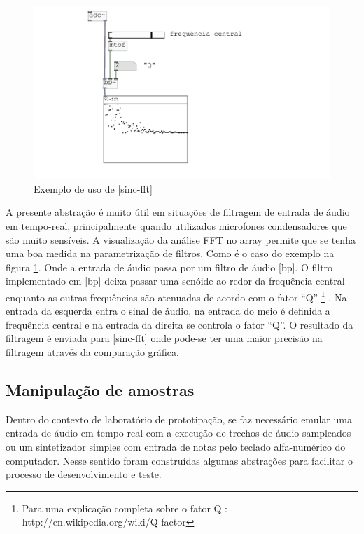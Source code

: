 \documentclass{ppgmus}
\begin{document}
\begin{figure}
\includegraphics[scale=.55]{sinc-fft-help}
\caption{Exemplo de uso de [sinc-fft]}
\label{sinc-fft-help}
\end{figure}


A presente abstração é muito útil em situações de filtragem de entrada de áudio em tempo-real, principalmente
quando utilizados microfones condensadores que são muito sensíveis.
A visualização da análise FFT no array permite que se tenha uma boa medida na parametrização de filtros.
Como é o caso do exemplo na figura \ref{sinc-fft-help}. Onde a entrada de áudio passa por um filtro
de áudio [bp\texttildelow]. O filtro implementado em [bp\texttildelow] deixa passar uma senóide ao
redor da frequência central enquanto as outras frequências são atenuadas de acordo com o fator ``Q''
\footnote{Para uma explicação completa sobre o fator Q : http://en.wikipedia.org/wiki/Q-factor} .
Na entrada da esquerda entra o sinal de áudio, na entrada do meio é definida a frequência central e na
entrada da direita se controla o fator ``Q''. O resultado da filtragem é enviada para [sinc-fft] onde 
pode-se ter uma maior precisão na filtragem através da comparação gráfica.

 

\subsection{Manipulação de amostras}


  Dentro do  contexto de laboratório de prototipação, se faz necessário emular uma entrada 
de áudio em tempo-real com a execução de trechos de áudio sampleados ou um sintetizador simples
com entrada de notas pelo teclado alfa-numérico do computador. Nesse sentido foram construídas
algumas abstrações para facilitar o processo de desenvolvimento e teste.
\end{document}

